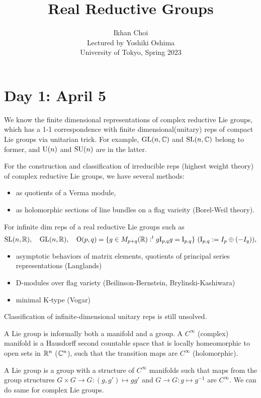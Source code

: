 \documentclass{../../small}
\begin{document}
\title{Real Reductive Groups}
\author{Ikhan Choi\\Lectured by Yoshiki Oshima\\University of Tokyo, Spring 2023}
\maketitle
\tableofcontents

\newpage
\section{Day 1: April 5}

We know the finite dimensional representations of complex reductive Lie groups, which has a 1-1 correspondence with finite dimensional(unitary) reps of compact Lie groups via unitarian trick.
For example, $\mathrm{GL}(n,\mathbb{C})$ and $\mathrm{SL}(n,\mathbb{C})$ belong to former, and $\mathrm{U}(n)$ and $\mathrm{SU}(n)$ are in the latter.

For the construction and classification of irreducible reps (highest weight theory) of complex reductive Lie groups, we have several methods:
\begin{itemize}
\item as quotients of a Verma module,
\item as holomorphic sections of line bundles on a flag varieity (Borel-Weil theory).
\end{itemize}

For infinite dim reps of a real reductive Lie groups such as
\[\SL(n,\R),\quad\GL(n,\R),\quad\rO(p,q)=\{g\in M_{p+q}(\R):^tg\rI_{p,q}g=\rI_{p,q}\}\ (\rI_{p,q}:=I_p\oplus(-I_q)),\]
\begin{itemize}
\item asymptotic behaviors of matrix elements, quotients of principal series representations (Langlands)
\item D-modules over flag variety (Beilinson-Bernstein, Brylinski-Kashiwara)
\item minimal K-type (Vogar)
\end{itemize}

Classification of infinite-dimensional unitary reps is still unsolved.

\bigskip

\begin{defn}
A Lie group is informally both a manifold and a group.
A $C^\infty$ (complex) manifold is a Hausdorff second countable space that is locally homeomorphic to open sets in $\mathbb{R}^n$ ($\mathbb{C}^n$), such that the transition maps are $C^\infty$ (holomorphic).

A Lie group is a group with a structure of $C^\infty$ manifolds such that maps from the group structures $G\times G\to G:(g,g')\mapsto gg'$ and $G\to G:g\mapsto g^{-1}$ are $C^\infty$.
We can do same for complex Lie groups.
\end{defn}
\end{document}
